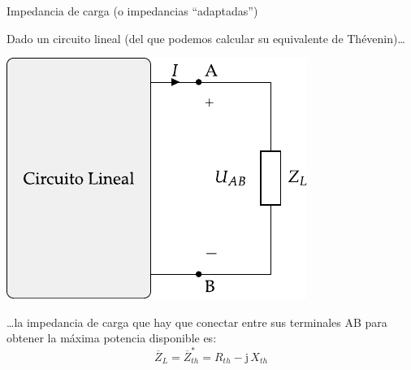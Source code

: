 \documentclass[aspectratio=169, usenames,svgnames,dvipsnames]{beamer}
\begin{document}
\begin{frame}{Impedancia de carga \hspace{3mm} (o impedancias ``adaptadas'')}

    \vspace{2mm}
    Dado un circuito lineal (del que podemos calcular su equivalente de Thévenin)\ldots{}
    \begin{center}
        \includegraphics[height=0.45\textheight]{../figs/EquivalenteThevenin.pdf}
    \end{center}
    
    \ldots{}la \alert{impedancia de carga} que hay que conectar entre sus terminales AB para obtener la máxima potencia disponible es:
    \[
      \boxed{\overline{Z}_L = \overline{Z}_{th}^* = R_{th} - \mathrm{j}\,X_{th}}
    \]
\end{frame}

\end{document}
